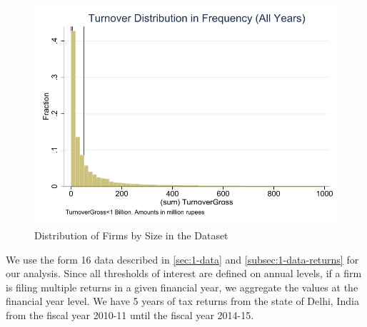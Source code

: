 \begin{figure}[ht!]
  \label{fig:Distribution_of_Firms}
  \caption{Distribution of Firms by Size in the Dataset}
  \includegraphics[width=1\textwidth]{graphs/TurnoverDistribution_Fraction_WeaklyPositive} 
\end{figure}

We use the form 16 data described in \cref{sec:1-data} and \cref{subsec:1-data-returns} for our analysis. Since all thresholds of interest are defined on annual levels, if a firm is filing multiple returns in a given financial year, we aggregate the values at the financial year level. We have 5 years of tax returns from the state of Delhi, India from the fiscal year 2010-11 until the fiscal year 2014-15.


